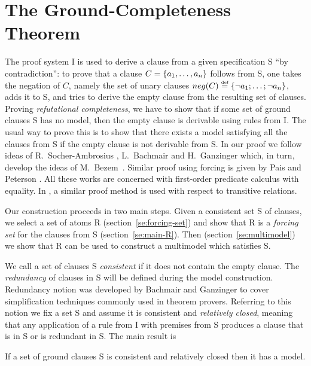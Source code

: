 \section{The Ground-Completeness Theorem} \label{se:completeness}

The proof system \C I  is used to derive a clause from a given
specification \C S ``by contradiction'':
to prove that a clause
$C = \{\List an,\}$ follows from \C S, one takes the
negation of $C$, namely the set of unary clauses $neg(C)\Def\{ \List{\neg a}n;\}$,
adds it to \C S, and tries to derive the empty clause from the resulting
set of clauses.
Proving {\em refutational completeness}, we have to show that 
if some set of ground clauses \C S 
has no model, then the empty clause is derivable using rules from \C I. 
The
usual way to prove this is to show that there exists a model satisfying all the
clauses from \C S if the empty clause is not derivable from \C S. In our proof
we follow ideas of R.~Socher-Ambrosius \cite{S-A}, L.~Bachmair and 
H.~Ganzinger \cite{BG249} which, in
 turn, develop the ideas of M.~Bezem~\cite{Bez}. Similar
proof using forcing is given by Pais and Peterson \cite{PP}. All these
 works are concerned with first-order predicate calculus with equality.
In \cite{BG249}, a similar proof method is used with respect to 
transitive relations.

Our construction proceeds in two main steps. Given a consistent set \C S
of clauses, we select a set of atoms \C R (section~\ref{se:forcing-set})
and show that \C R is a {\em forcing set}\/ for  the clauses from \C S
(section~\ref{se:main-R}). Then (section~\ref{se:multimodel}) we show that
\C R can be used to construct a multimodel which satisfies \C S.

We call a set of clauses \C S {\em consistent} if it does not contain the
empty clause. The {\em redundancy} of clauses in \C S will be defined during
the model construction. Redundancy notion was developed by Bachmair and
Ganzinger \cite{BG} to cover simplification techniques commonly used in
theorem provers.  Referring to this notion we fix a set \C S and assume it is
consistent and {\em relatively closed}, meaning that any application of a
rule from \C I with premises from \C S produces a clause that is in \C S or is
redundant in \C S. The main result is

\begin{THEOREM} 
\label{th:ground-completeness}
If a set of ground clauses \C S is consistent and relatively closed then it
has a model.
\end{THEOREM}

